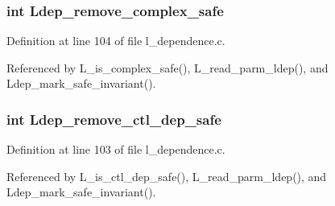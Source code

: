 \subsubsection{\setlength{\rightskip}{0pt plus 5cm}int \bf{Ldep\_\-remove\_\-complex\_\-safe}}\label{l__dependence_8h_511f90417dd270ddcac1a3d75ca2c12b}




Definition at line 104 of file l\_\-dependence.c.

Referenced by L\_\-is\_\-complex\_\-safe(), L\_\-read\_\-parm\_\-ldep(), and Ldep\_\-mark\_\-safe\_\-invariant().
\subsubsection{\setlength{\rightskip}{0pt plus 5cm}int \bf{Ldep\_\-remove\_\-ctl\_\-dep\_\-safe}}\label{l__dependence_8h_4bb5d2f22feac9f535966256c7e42e1e}




Definition at line 103 of file l\_\-dependence.c.

Referenced by L\_\-is\_\-ctl\_\-dep\_\-safe(), L\_\-read\_\-parm\_\-ldep(), and Ldep\_\-mark\_\-safe\_\-invariant().